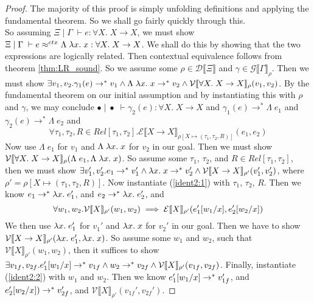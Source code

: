 \documentclass[a4paper, 11pt]{report}
\theoremstyle{definition}
\newcommand{\var}{x}
\newcommand{\expr}{e}
\newcommand{\val}{v}
\newcommand{\valB}{w}
\newcommand{\Tvar}{X}
\newcommand{\Tlam}{\Lambda\;}
\newcommand{\subst}[3]{#1{\left[#3 \middle/ #2 \right]}}
\newcommand{\Tfunc}[2]{#1 \rightarrow #2}
\newcommand{\Tall}[2]{\forall #1.\; #2}
\newcommand{\typ}{\tau}
\newcommand{\venv}{\Gamma}
\newcommand{\tenv}{\Xi}
\newcommand{\emptenv}{\bullet}
\newcommand{\empvenv}{\bullet}
\newcommand{\jdg}[4]{#1 \; | \; #2 \; \vdash #3 : #4}
\newcommand{\jdgRel}[6]{#1 \; | \; #2 \; \vdash #3 \approx^{#4} #5 : #6}
\newcommand{\ctxRel}[5]{\jdgRel{#1}{#2}{#3}{ctx}{#4}{#5}}
\newcommand{\stepS}{\rightarrow^*}
\newcommand{\ValInp}[2]{\mathcal{V} \llbracket #1 \rrbracket_{#2}}
\newcommand{\ExpInp}[2]{\mathcal{E} \llbracket #1 \rrbracket_{#2}}
\newcommand{\VenvInp}[2]{\mathcal{G} \llbracket #1 \rrbracket_{#2}}
\newcommand{\TenvInp}[1]{\mathcal{D} \llbracket #1 \rrbracket}
\newcommand{\map}[2]{#1 \mapsto #2}
\begin{document}
\begin{proof}
  The majority of this proof is simply unfolding definitions and applying the fundamental theorem. So we shall go fairly quickly through this.\\
  So assuming $\jdg{\tenv}{\venv}{\expr}{\Tall{\Tvar}{\Tfunc{\Tvar}{\Tvar}}}$, we must show $\ctxRel{\tenv}{\venv}{\expr}{\Tlam \fun \var . \var}{\Tall{\Tvar}{\Tfunc{\Tvar}{\Tvar}}}$. We shall do this by showing that the two expressions are logically related. Then contextual equivalence follows from theorem \ref{thm:LR_sound}. So we assume some $ \rho \in \TenvInp{\tenv}$ and $\gamma \in \VenvInp{\venv}{\rho}$. Then we must show $\exists \val_1, \val_2 . \gamma_1(\expr) \stepS \val_1 \land \Tlam \fun \var . \var \stepS \val_2 \land \ValInp{\Tall{\Tvar}{\Tfunc{\Tvar}{\Tvar}}}{\rho}(\val_1, \val_2)$. By the fundamental theorem on our initial assumption and by instantiating this with $\rho$ and $\gamma$, we may conclude $\jdg{\emptenv}{\empvenv}{\gamma_2(\expr)}{\Tall{\Tvar}{\Tfunc{\Tvar}{\Tvar}}}$ and $\gamma_1(\expr) \stepS \Tlam \expr_1$ and $\gamma_2(\expr) \stepS \Tlam \expr_2$ and 
  \begin{equation}\label{ident2:1}
    \forall \typ_1, \typ_2, R \in Rel[\typ_1, \typ_2] . \ExpInp{\Tfunc{\Tvar}{\Tvar}}{\rho[\map{\Tvar}{(\typ_1, \typ_2, R)}]}(\expr_1, \expr_2)
  \end{equation}
  Now use $\Tlam \expr_1$ for $\val_1$ and $\Tlam \fun \var . \var$ for $\val_2$ in our goal. Then we must show $\ValInp{\Tall{\Tvar}{\Tfunc{\Tvar}{\Tvar}}}{\rho}(\Tlam \expr_1, \Tlam \fun \var . \var)$. So assume some $\typ_1$, $\typ_2$, and $R \in Rel[\typ_1, \typ_2]$, then we must show 
  $\exists \val_1', \val_2' . \expr_1 \stepS \val_1' \land \fun \var . \var \stepS \val_2' \land \ValInp{\Tfunc{\Tvar}{\Tvar}}{\rho'}(\val_1', \val_2')$, where $\rho' = \rho[\map{\Tvar}{(\typ_1, \typ_2, R)}]$.
  Now instantiate (\ref*{ident2:1}) with $\typ_1$, $\typ_2$, $R$. Then we know $\expr_1 \stepS \fun \var . \expr_1'$, and $\expr_2 \stepS \fun \var . \expr_2'$, and
  \begin{equation}\label{ident2:2}
    \forall \valB_1, \valB_2 . \ValInp{\Tvar}{\rho'}(\valB_{1}, \valB_{2}) \implies \ExpInp{\Tvar}{\rho'}(\subst{\expr_1'}{\var}{\valB_1}, \subst{\expr_2'}{\var}{\valB_2})
  \end{equation}
  We then use $\fun \var . \expr_1'$ for $\val_1'$ and $\fun \var . \var$ for $\val_2'$ in our goal. Then we have to show $\ValInp{\Tfunc{\Tvar}{\Tvar}}{\rho'}(\fun \var . \expr_1', \fun \var . \var)$. So assume some $\valB_1$ and $\valB_2$, such that $\ValInp{\Tvar}{\rho'}(\valB_1, \valB_2)$, then it suffices to show $\exists \val_{1f}, \val_{2f} . \subst{\expr_1'}{\var}{\valB_1} \stepS \val_{1f} \land \valB_2 \stepS \val_{2f} \land \ValInp{\Tvar}{\rho'}(\val_{1f}, \val_{2f})$. Finally, instantiate (\ref*{ident2:2}) with $\valB_1$ and $\valB_2$. Then we know $\subst{\expr_1'}{\var}{\valB_1} \stepS \val_{1f}'$, and $\subst{\expr_2'}{\var}{\valB_2}) \stepS \val_{2f}'$, and $\ValInp{\Tvar}{\rho'}(\val_{1f}', \val_{2f}')$.

\end{proof}
\end{document}
